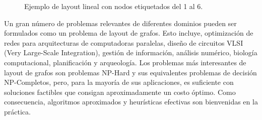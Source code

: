 \begin{figure}
	\centering
	\caption{Ejemplo de layout lineal con nodos etiquetados del 1 al 6.}
	\label{fig:ejemplo_grafo_linear}
\end{figure}

Un gran número de problemas relevantes de diferentes dominios pueden ser formulados como un problema de layout de grafos. Esto incluye, optimización de redes para arquitecturas de computadoras paralelas, diseño de circuitos VLSI (Very Large-Scale Integration), gestión de información, análisis numérico, biología computacional, planificación y arqueología. Los problemas más interesantes de layout de grafos son problemas NP-Hard y sus equivalentes problemas de decisión NP-Completos, pero, para la mayoría de sus aplicaciones, es suficiente con soluciones factibles que consigan aproximadamente un costo óptimo. Como consecuencia, algoritmos aproximados y heurísticas efectivas son bienvenidas en la práctica.


